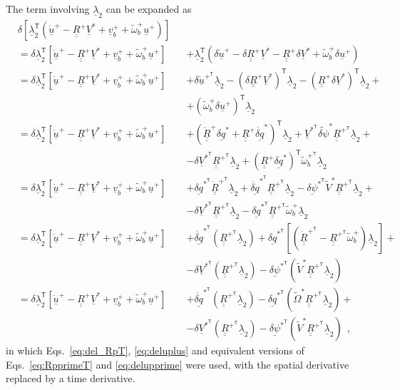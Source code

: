 \documentclass[12pt,a4paper,oneside,english]{abntex2} %
\newcommand{\vect}[1]{\underline{#1}}
\def\tens#1{\underline{\underline{#1}}}
\def\til#1{\widetilde{#1}}
\def\lb{\left[}
\def\rb{\right]}
\def\lp{\left(}
\def\rp{\right)}
\def\T{\mathsf{T}}
\def\R{\tens{R}}
\def\Rp{\R^+}
\def\RpT{\R^{+^\T}}
\def\Rpdot{\dot{\R}^{+}}
\def\RpTdot{\dot{\R}^{+^\T}}
\def\u{\vect{u}}
\def\uplus{\u^{+}}
\def\updot{\dot{\u}^{+}}
\def\updotT{\dot{\u}^{+^\T}}
\def\vb{\vect{v}_b}
\def\vbplus{\vb^{+}}
\def\omtil{\til{\omega}_b}
\def\omtilp{\omtil^{+}}
\def\omtilpT{\omtil^{+^\T}}
\def\V{\vect{V}}
\def\Vs{\V^{*}}
\def\VsT{\V^{*^\T}}
\def\Vtils{\til{V}^{*}}
\def\Omtil{\til{\Omega}}
\def\Omtils{\Omtil^{*}}
\def\delq{\vect{\delta q}}
\def\delqs{\delq^*}
\def\delqdots{\dot{\delq}^{*}}
\def\delqdotsT{\dot{\delq}^{*^\T}}
\def\delqsT{\delq^{*^\T}}
\def\delpsi{\vect{\delta\psi}}
\def\delpsisT{\delpsi^{*^\T}}
\def\delpsitil{\til{\delta\psi}}
\def\delpsitils{\delpsitil^*}
\def\lamb{\vect{\lambda}}
\begin{document}
\begin{apendicesenv}
The term involving $\lamb_2$ can be expanded as
\begin{equation}
    \begin{alignedat}{2}
    &\delta\lb\lamb_2^\T\lp\updot-\Rp\Vs+\vbplus+\omtilp\uplus\rp\rb
    \\
    &= \delta\lamb_2^\T\lb\updot-\Rp\Vs+\vbplus+\omtilp\uplus\rb &&+ \lamb_2^\T\lp \delta\updot - \delta\Rp\Vs - \Rp\delta\Vs + \omtilp\delta\uplus \rp
    \\
    &= \delta\lamb_2^\T\lb\updot-\Rp\Vs+\vbplus+\omtilp\uplus\rb &&+  \delta\updotT\lamb_2 - \lp\delta\Rp\Vs\rp^\T\lamb_2 - \lp\Rp\delta\Vs\rp^\T\lamb_2 +
    \\
    & &&+\lp\omtilp\delta\uplus\rp^\T\lamb_2 
    \\
    &= \delta\lamb_2^\T\lb\updot-\Rp\Vs+\vbplus+\omtilp\uplus\rb &&+  \lp\Rpdot\delqs+\Rp\delqdots\rp^\T\lamb_2 + \VsT\delpsitils\RpT\lamb_2 +
    \\
    & &&-\delta\VsT\RpT\lamb_2 + \lp\Rp\delqs\rp^\T\omtilpT\lamb_2
    \\
    &= \delta\lamb_2^\T\lb\updot-\Rp\Vs+\vbplus+\omtilp\uplus\rb &&+  \delqsT\RpTdot\lamb_2 + \delqdotsT\RpT\lamb_2 - \delpsisT\Vtils\RpT\lamb_2 +
    \\
    & &&-\delta\VsT\RpT\lamb_2 -\delqsT\RpT\omtilp\lamb_2
    \\
    &= \delta\lamb_2^\T\lb\updot-\Rp\Vs+\vbplus+\omtilp\uplus\rb &&+
    \delqdotsT\lp\RpT\lamb_2\rp + \delqsT\lb\lp\RpTdot-\RpT\omtilp\rp\lamb_2\rb +  
    \\
    & &&-\delta\VsT\lp\RpT\lamb_2\rp - \delpsisT\lp\Vtils\RpT\lamb_2\rp 
    \\
    &= \delta\lamb_2^\T\lb\updot-\Rp\Vs+\vbplus+\omtilp\uplus\rb &&+ \delqdotsT\lp\RpT\lamb_2\rp - \delqsT\lp\Omtils\RpT\lamb_2\rp +
    \\
    & &&-\delta\VsT\lp\RpT\lamb_2\rp - \delpsisT\lp\Vtils\RpT\lamb_2\rp \ \ ,
    \label{eq:dellambda2_exp}
    \end{alignedat}
\end{equation}
in which  Eqs.~\eqref{eq:del_RpT},  \eqref{eq:deluplus} and equivalent versions of Eqs.~\eqref{eq:RpprimeT} and  \eqref{eq:delupprime} were used, with the spatial derivative replaced by a time derivative.


\end{apendicesenv}
\end{document}
